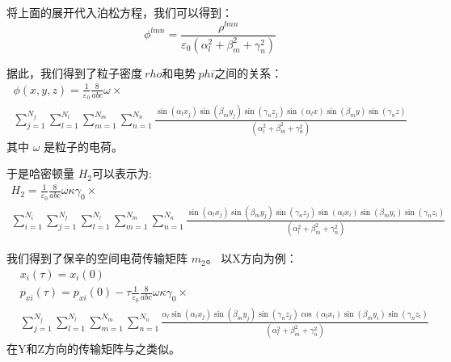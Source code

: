 {将上面的展开代入泊松方程，我们可以得到：
\begin{equation}
{{\phi }^{lmn}}=\frac{{{\rho }^{lmn}}}{{{\varepsilon }_{0}}(\alpha _{l}^{2}+\beta _{m}^{2}+\gamma _{n}^{2})}
\end{equation}

据此，我们得到了粒子密度$ \ rho $和电势$ \ phi $之间的关系：
\begin{multline}
\phi (x,y,z)=\frac{1}{{{\varepsilon }_{0}}}\frac{8}{abc}\omega \times \\ \sum\limits_{j=1}^{{{N}_{j}}}{\sum\limits_{l=1}^{{{N}_{l}}}{\sum\limits_{m=1}^{{{N}_{m}}}{\sum\limits_{n=1}^{{{N}_{n}}}{\frac{\sin ({{\alpha }_{l}}{{x}_{j}})\sin ({{\beta }_{m}}{{y}_{j}})\sin ({{\gamma }_{n}}{{z}_{j}})\sin ({{\alpha }_{l}}x)\sin ({{\beta }_{m}}y)\sin ({{\gamma }_{n}}z)}{(\alpha _{l}^{2}+\beta _{m}^{2}+\gamma _{n}^{2})}}}}}
\end{multline}
其中 $\omega $ 是粒子的电荷。

于是哈密顿量 ${{H}_{2}}$可以表示为:
\begin{multline}
{{H}_{2}}=\frac{1}{{{\varepsilon }_{0}}}\frac{8}{abc}\omega \kappa {{\gamma}_{0}} \times \\
\sum\limits_{i=1}^{{{N}_{i}}}{\sum\limits_{j=1}^{{{N}_{j}}}{\sum\limits_{l=1}^{{{N}_{l}}}{\sum\limits_{m=1}^{{{N}_{m}}}{\sum\limits_{n=1}^{{{N}_{n}}}
{\frac{\sin ({{\alpha }_{l}}{{x}_{j}})\sin ({{\beta }_{m}}{{y}_{j}})\sin ({{\gamma }_{n}}{{z}_{j}})\sin ({{\alpha }_{l}}{{x}_{i}})\sin ({{\beta }_{m}}{{y}_{i}})\sin ({{\gamma }_{n}}{{z}_{i}})}{(\alpha _{l}^{2}+\beta _{m}^{2}+\gamma _{n}^{2})}}
}}}}
\end{multline}

我们得到了保辛的空间电荷传输矩阵 ${{m}_{2}}$。 以X方向为例：
\begin{align}
&{{x}_{i}}(\tau )= {{x}_{i}}(0) \\
 \nonumber &{{p}_{xi}}(\tau )= {{p}_{xi}}(0)-\tau \frac{1}{{{\varepsilon }_{0}}}\frac{8}{abc}\omega \kappa {{\gamma }_{0}} \times \\
 &\sum\limits_{j=1}^{{{N}_{j}}}{\sum\limits_{l=1}^{{{N}_{l}}}{\sum\limits_{m=1}^{{{N}_{m}}}{\sum\limits_{n=1}^{{{N}_{n}}}{\frac{{{\alpha }_{l}}\sin ({{\alpha }_{l}}{{x}_{j}})\sin ({{\beta }_{m}}{{y}_{j}})\sin ({{\gamma }_{n}}{{z}_{j}})\cos ({{\alpha }_{l}}{{x}_{i}})\sin ({{\beta }_{m}}{{y}_{i}})\sin ({{\gamma }_{n}}{{z}_{i}})}{(\alpha _{l}^{2}+\beta _{m}^{2}+\gamma _{n}^{2})}}}}}\label{eq:map1}
\end{align}
在Y和Z方向的传输矩阵与之类似。


}

